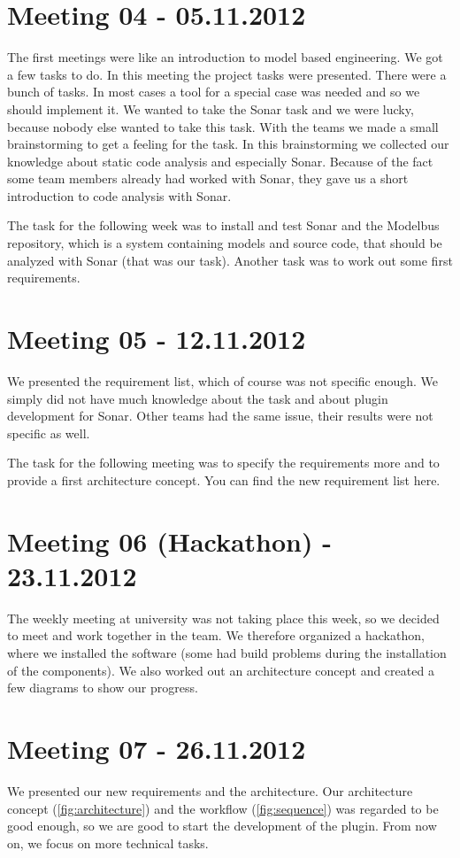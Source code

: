 \section{Meeting 04 - 05.11.2012}
The first meetings were like an introduction to model based engineering. We got a few tasks to do. In this meeting the project tasks were presented. There were a bunch of tasks. In most cases a tool for a special case was needed and so we should implement it. We wanted to take the Sonar task and we were lucky, because nobody else wanted to take this task. With the teams we made a small brainstorming to get a feeling for the task. In this brainstorming we collected our knowledge about static code analysis and especially Sonar. Because of the fact some team members already had worked with Sonar, they gave us a short introduction to code analysis with Sonar.

The task for the following week was to install and test Sonar and the Modelbus repository, which is a system containing models and source code, that should be analyzed with Sonar (that was our task). Another task was to work out some first requirements.

\section{Meeting 05 - 12.11.2012}
We presented the requirement list, which of course was not specific enough. We simply did not have much knowledge about the task and about plugin development for Sonar. Other teams had the same issue, their results were not specific as well.

The task for the following meeting was to specify the requirements more and to provide a first architecture concept. You can find the new requirement list here.

\section{Meeting 06 (Hackathon) - 23.11.2012}
The weekly meeting at university was not taking place this week, so we decided to meet and work together in the team. We therefore organized a hackathon, where we installed the software (some had build problems during the installation of the components). We also worked out an architecture concept and created a few diagrams to show our progress.

\section{Meeting 07 - 26.11.2012}
We presented our new requirements and the architecture. Our architecture concept (\autoref{fig:architecture}) and the workflow (\autoref{fig:sequence}) was regarded to be good enough, so we are good to start the development of the plugin. From now on, we focus on more technical tasks.

